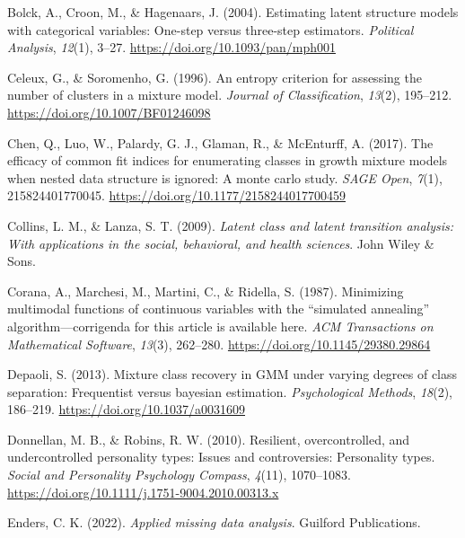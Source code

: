 \documentclass[
  ,man,floatsintext]{apa6}
\newlength{\cslhangindent}
\newlength{\cslentryspacingunit} %
\newenvironment{CSLReferences}[2] %
 {%
  \setlength{\parindent}{0pt}
  \ifodd #1
  \let\oldpar\par
  \def\par{\hangindent=\cslhangindent\oldpar}
  \fi
  \setlength{\parskip}{#2\cslentryspacingunit}
 }%
 {}
\begin{document}
\begin{CSLReferences}{1}{0}
\leavevmode{}%
Bolck, A., Croon, M., \& Hagenaars, J. (2004). Estimating latent structure models with categorical variables: One-step versus three-step estimators. \emph{Political Analysis}, \emph{12}(1), 3--27. \url{https://doi.org/10.1093/pan/mph001}

\leavevmode{}%
Celeux, G., \& Soromenho, G. (1996). An entropy criterion for assessing the number of clusters in a mixture model. \emph{Journal of Classification}, \emph{13}(2), 195--212. \url{https://doi.org/10.1007/BF01246098}

\leavevmode{}%
Chen, Q., Luo, W., Palardy, G. J., Glaman, R., \& McEnturff, A. (2017). The efficacy of common fit indices for enumerating classes in growth mixture models when nested data structure is ignored: A monte carlo study. \emph{{SAGE} Open}, \emph{7}(1), 215824401770045. \url{https://doi.org/10.1177/2158244017700459}

\leavevmode{}%
Collins, L. M., \& Lanza, S. T. (2009). \emph{Latent class and latent transition analysis: With applications in the social, behavioral, and health sciences}. John Wiley \& Sons.

\leavevmode{}%
Corana, A., Marchesi, M., Martini, C., \& Ridella, S. (1987). Minimizing multimodal functions of continuous variables with the {``simulated annealing''} algorithm---corrigenda for this article is available here. \emph{{ACM} Transactions on Mathematical Software}, \emph{13}(3), 262--280. \url{https://doi.org/10.1145/29380.29864}

\leavevmode{}%
Depaoli, S. (2013). Mixture class recovery in {GMM} under varying degrees of class separation: Frequentist versus bayesian estimation. \emph{Psychological Methods}, \emph{18}(2), 186--219. \url{https://doi.org/10.1037/a0031609}

\leavevmode{}%
Donnellan, M. B., \& Robins, R. W. (2010). Resilient, overcontrolled, and undercontrolled personality types: Issues and controversies: Personality types. \emph{Social and Personality Psychology Compass}, \emph{4}(11), 1070--1083. \url{https://doi.org/10.1111/j.1751-9004.2010.00313.x}

\leavevmode{}%
Enders, C. K. (2022). \emph{Applied missing data analysis}. Guilford Publications.


\end{CSLReferences}
\end{document}
